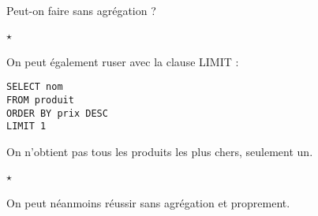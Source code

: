 \begin{rem}
	Peut-on faire sans agrégation ?
\end{rem}

\paragraph{$\star$} On peut également ruser avec la clause LIMIT :

\begin{lstlisting}
SELECT nom
FROM produit
ORDER BY prix DESC
LIMIT 1
\end{lstlisting} 

\begin{rem}
	On n'obtient pas tous les produits les plus chers, seulement un.
\end{rem}

\paragraph{$\star$} On peut néanmoins réussir sans agrégation et proprement.\\

